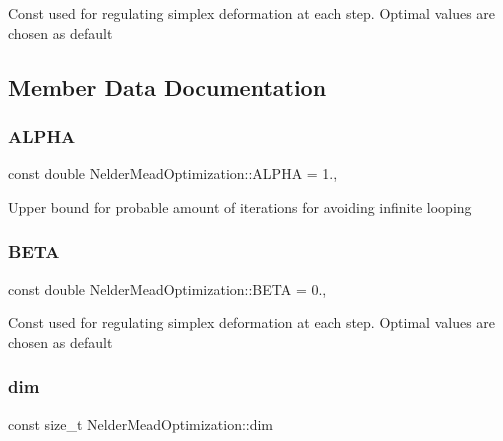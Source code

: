 Const used for regulating simplex deformation at each step. Optimal values are chosen as default 

\subsection{Member Data Documentation}
\mbox{\label{class_nelder_mead_optimization_aa23d74cc1718065309ae6cf0daae7ae2}} 
\subsubsection{\texorpdfstring{A\+L\+P\+HA}{ALPHA}}
{\footnotesize\ttfamily const double Nelder\+Mead\+Optimization\+::\+A\+L\+P\+HA = 1.\hspace{0.3cm}{\ttfamily [static]}, {\ttfamily [private]}}

Upper bound for probable amount of iterations for avoiding infinite looping \mbox{\label{class_nelder_mead_optimization_abcbd4c2b659649dbefe02c231b10fb2b}} 
\subsubsection{\texorpdfstring{B\+E\+TA}{BETA}}
{\footnotesize\ttfamily const double Nelder\+Mead\+Optimization\+::\+B\+E\+TA = 0.\hspace{0.3cm}{\ttfamily [static]}, {\ttfamily [private]}}

Const used for regulating simplex deformation at each step. Optimal values are chosen as default \mbox{\label{class_nelder_mead_optimization_acc80e311f32769ddbc923cd7e78718d4}} 
\subsubsection{\texorpdfstring{dim}{dim}}
{\footnotesize\ttfamily const size\+\_\+t Nelder\+Mead\+Optimization\+::dim\hspace{0.3cm}{\ttfamily [private]}}

